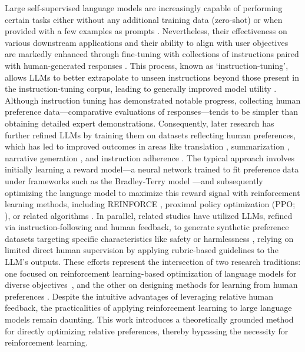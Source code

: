 Large self-supervised language models are increasingly capable of performing certain tasks either without any additional training data (zero-shot) \citep{radford2019language} or when provided with a few examples as prompts \citep{gpt3,megatron,chowdhery2022palm}. Nevertheless, their effectiveness on various downstream applications and their ability to align with user objectives are markedly enhanced through fine-tuning with collections of instructions paired with human-generated responses \citep{mishra-etal-2022-cross,sanh2022multitask,chung2022scaling,thoppilan2022lamda}. This process, known as `instruction-tuning', allows LLMs to better extrapolate to unseen instructions beyond those present in the instruction-tuning corpus, leading to generally improved model utility \citep{chung2022scaling}. Although instruction tuning has demonstrated notable progress, collecting human preference data—comparative evaluations of responses—tends to be simpler than obtaining detailed expert demonstrations. Consequently, later research has further refined LLMs by training them on datasets reflecting human preferences, which has led to improved outcomes in areas like translation \citep{kreutzer-etal-2018-reliability}, summarization \citep{stiennon2022learning,ziegler2020finetuning}, narrative generation \citep{ziegler2020finetuning}, and instruction adherence \citep{ouyang2022training,ramamurthy2023is}. The typical approach involves initially learning a reward model—a neural network trained to fit preference data under frameworks such as the Bradley-Terry model \citep{bradley1952rankanalysis}—and subsequently optimizing the language model to maximize this reward signal with reinforcement learning methods, including REINFORCE \citep{williams1992reinforce}, proximal policy optimization (PPO; \cite{schulman2017proximal}), or related algorithms \citep{ramamurthy2023is}. In parallel, related studies have utilized LLMs, refined via instruction-following and human feedback, to generate synthetic preference datasets targeting specific characteristics like safety or harmlessness \citep{bai2022constitutional}, relying on limited direct human supervision by applying rubric-based guidelines to the LLM’s outputs. These efforts represent the intersection of two research traditions: one focused on reinforcement learning-based optimization of language models for diverse objectives~\citep{Ranzato2015SequenceLT,paulus2018a,wu2018learning}, and the other on designing methods for learning from human preferences \citep{christiano2017deep,kupcsik2018learning}. Despite the intuitive advantages of leveraging relative human feedback, the practicalities of applying reinforcement learning to large language models remain daunting. This work introduces a theoretically grounded method for directly optimizing relative preferences, thereby bypassing the necessity for reinforcement learning.

